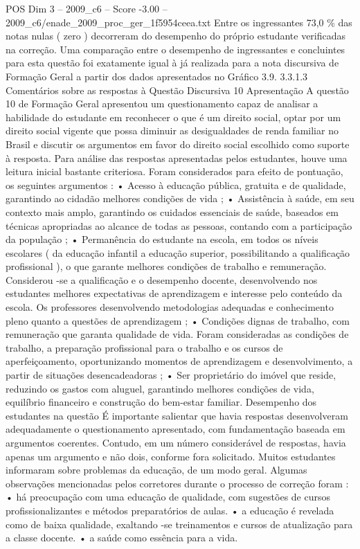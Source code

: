 \begin{textsample}{POS Dim 3 – 2009\_c6 – Score -3.00 – 2009\_c6/enade\_2009\_proc\_ger\_1f5954ceea.txt}
Entre os ingressantes 73,0 \% das notas nulas ( zero ) decorreram do desempenho do próprio estudante verificadas na correção.
Uma comparação entre o desempenho de ingressantes e concluintes para esta questão foi exatamente igual à já realizada para a nota discursiva de Formação Geral a partir dos dados apresentados no Gráfico 3.9. 3.3.1.3 Comentários sobre as respostas à Questão Discursiva 10 Apresentação A questão 10 de Formação Geral apresentou um questionamento capaz de analisar a habilidade do estudante em reconhecer o que é um direito social, optar por um direito social vigente que possa diminuir as desigualdades de renda familiar no Brasil e discutir os argumentos em favor do direito social escolhido como suporte à resposta.
Para análise das respostas apresentadas pelos estudantes, houve uma leitura inicial bastante criteriosa.
Foram considerados para efeito de pontuação, os seguintes argumentos : • Acesso à educação pública, gratuita e de qualidade, garantindo ao cidadão melhores condições de vida ; • Assistência à saúde, em seu contexto mais amplo, garantindo os cuidados essenciais de saúde, baseados em técnicas apropriadas ao alcance de todas as pessoas, contando com a participação da população ; • Permanência do estudante na escola, em todos os níveis escolares ( da educação infantil a educação superior, possibilitando a qualificação profissional ), o que garante melhores condições de trabalho e remuneração.
Considerou -se a qualificação e o desempenho docente, desenvolvendo nos estudantes melhores expectativas de aprendizagem e interesse pelo conteúdo da escola.
Os professores desenvolvendo metodologias adequadas e conhecimento pleno quanto a questões de aprendizagem ; • Condições dignas de trabalho, com remuneração que garanta qualidade de vida.
Foram consideradas as condições de trabalho, a preparação profissional para o trabalho e os cursos de aperfeiçoamento, oportunizando momentos de aprendizagem e desenvolvimento, a partir de situações desencadeadoras ; • Ser proprietário do imóvel que reside, reduzindo os gastos com aluguel, garantindo melhores condições de vida, equilíbrio financeiro e construção do bem-estar familiar.
Desempenho dos estudantes na questão É importante salientar que havia respostas desenvolveram adequadamente o questionamento apresentado, com fundamentação baseada em argumentos coerentes.
Contudo, em um número considerável de respostas, havia apenas um argumento e não dois, conforme fora solicitado.
Muitos estudantes informaram sobre problemas da educação, de um modo geral.
Algumas observações mencionadas pelos corretores durante o processo de correção foram : • há preocupação com uma educação de qualidade, com sugestões de cursos profissionalizantes e métodos preparatórios de aulas. • a educação é revelada como de baixa qualidade, exaltando -se treinamentos e cursos de atualização para a classe docente. • a saúde como essência para a vida.

\end{textsample}
